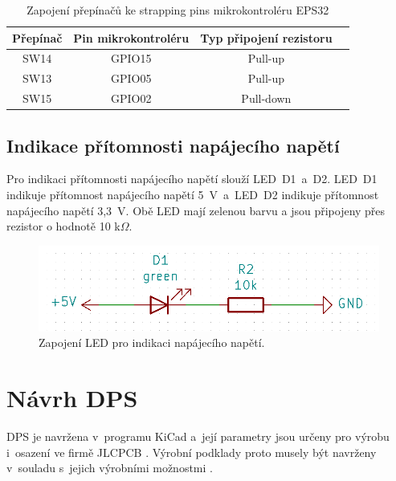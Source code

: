   \begin{table}[!h]
    \caption{Zapojení přepínačů ke strapping pins mikrokontroléru EPS32}
    \begin{center}
        \begin{tabular}{|c|c|c|c|}
            \hline
            {\bf Přepínač}   & {\bf Pin mikrokontroléru} & {\bf Typ připojení rezistoru} \\
            \hline
            SW14      & GPIO15 & Pull-up \\
            \hline
            SW13      & GPIO05 & Pull-up \\
            \hline
            SW15      & GPIO02 & Pull-down \\
            \hline
        \end{tabular}    
    \end{center}
  \end{table}

  \section{Indikace přítomnosti napájecího napětí}
  Pro indikaci přítomnosti napájecího napětí slouží LED~D1~a~D2. LED~D1 indikuje přítomnost napájecího napětí 
  5~V~a~LED~D2 indikuje přítomnost napájecího napětí 3,3~V. Obě LED mají zelenou barvu a jsou připojeny přes
  rezistor o hodnotě 10 k$\Omega$.

  \begin{figure}[!h]
    \begin{center}
      \includegraphics[scale=0.5]{obrazky/powerLED.png}
    \end{center}
    \caption[Zapojení LED pro indikaci napájecího napětí]{Zapojení LED pro indikaci napájecího napětí.}
  \end{figure}

  \chapter{Návrh DPS}
  DPS je navržena v~programu KiCad a~její parametry jsou určeny pro výrobu i~osazení ve firmě JLCPCB \cite{KiCad} \cite{JLCPCB}. Výrobní 
  podklady proto musely být navrženy v~souladu s~jejich výrobními možnostmi \cite{JLCPCB_Capabilities}.

